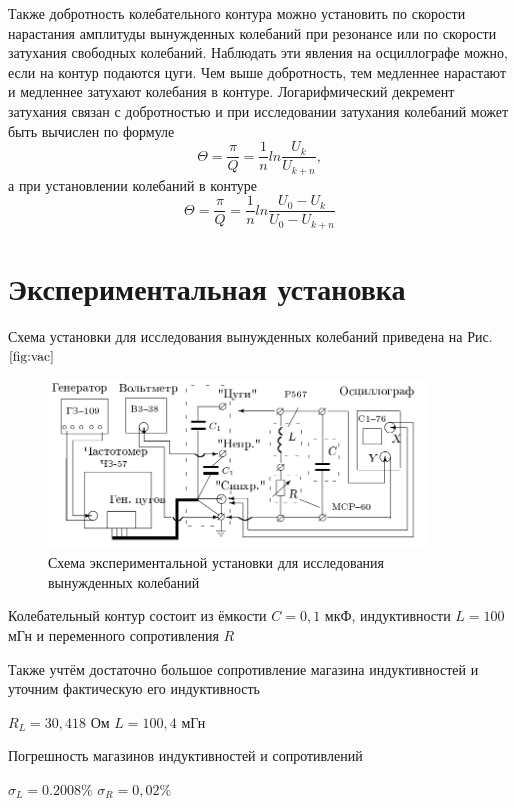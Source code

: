 \documentclass[a4paper, fontsize = 14pt]{article}
\begin{document}
Также добротность колебательного контура можно установить по скорости нарастания амплитуды вынужденных колебаний при резонансе или по скорости затухания свободных колебаний. Наблюдать эти явления на осциллографе можно, если на контур подаются цуги. Чем выше добротность, тем медленнее нарастают и медленнее затухают колебания в контуре.
Логарифмический декремент затухания связан с добротностью и при исследовании затухания колебаний может быть вычислен по формуле 
\begin{equation}
    \Theta = \frac{\pi}{Q} = \frac{1}{n} ln \frac{U_k}{U_{k+n}},
\end{equation}
а при установлении колебаний в контуре
\begin{equation}
    \Theta = \frac{\pi}{Q} = \frac{1}{n} ln \frac{U_0 - U_k}{U_0 - U_{k+n}}
\end{equation}
\section{Экспериментальная установка}
Схема установки для исследования вынужденных колебаний приведена на Рис. $\ref{fig:vac}$ 
\begin{figure}[h]
    \centering
    \includegraphics[width=10cm]{fig1.PNG}
    \caption{Схема экспериментальной установки для исследования вынужденных колебаний}
    \label{fig:vac}
\end{figure}

Колебательный контур состоит из ёмкости $C = 0,1$ мкФ, индуктивности $L = 100$  мГн и переменного сопротивления $R$ \par
Также учтём достаточно большое сопротивление магазина индуктивностей и уточним фактическую его индуктивность
\begin{center}
    $R_L = 30,418$ Ом \hspace{1cm} $L = 100,4$ мГн
\end{center}

Погрешность магазинов индуктивностей и сопротивлений
\begin{center}
    $\sigma_L = 0.2008\%$ \hspace{1cm} $\sigma_R = 0,02\%$
\end{center}
\end{document}
